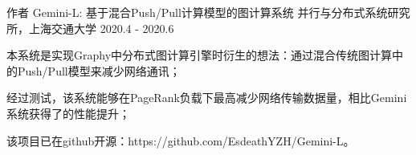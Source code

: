 \begin{cventries}
\vspace{-3mm}

\cventry
{作者} %
{Gemini-L: 基于混合Push/Pull计算模型的图计算系统} %
{并行与分布式系统研究所，上海交通大学} %
{2020.4 - 2020.6} %
{ %
	\begin{cvitems}
	 \item {本系统是实现Graphy中分布式图计算引擎时衍生的想法：通过混合传统图计算中的Push/Pull模型来减少网络通讯；}
	 \item {经过测试，该系统能够在PageRank负载下最高减少网络传输数据量，相比Gemini系统获得了的性能提升；}
	 \item {该项目已在github开源：https://github.com/EsdeathYZH/Gemini-L。}
	\end{cvitems}
}


\end{cventries}